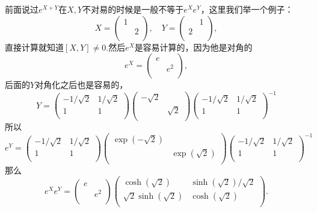 \documentclass[8pt]{book}
\theoremstyle{plain}
\begin{document}
前面说过$e^{X+Y}$在$X,Y$不对易的时候是一般不等于$e^Xe^Y$，这里我们举一个例子：
\[
X=\begin{pmatrix}
1&\\
&2\\
\end{pmatrix},
\quad
Y=\begin{pmatrix}
&1\\
2&\\
\end{pmatrix},
\]
直接计算就知道$[X,Y]\neq 0$.然后$e^X$是容易计算的，因为他是对角的
\[
e^X=\begin{pmatrix}
e&\\
&e^2\\
\end{pmatrix},
\]
后面的$Y$对角化之后也是容易的，
\[
Y=
\begin{pmatrix}
 -1/\sqrt{2} & 1/\sqrt{2} \\
 1 & 1 \\
\end{pmatrix}
\begin{pmatrix}
 -\sqrt{2} &  \\
  & \sqrt{2} \\
\end{pmatrix}
\begin{pmatrix}
 -1/\sqrt{2} & 1/\sqrt{2} \\
 1 & 1 \\
\end{pmatrix}^{-1}
\]
所以
\[
e^Y=
\begin{pmatrix}
 -1/\sqrt{2} & 1/\sqrt{2} \\
 1 & 1 \\
\end{pmatrix}
\begin{pmatrix}
 \exp(-\sqrt{2}) &  \\
  & \exp(\sqrt{2}) \\
\end{pmatrix}
\begin{pmatrix}
 -1/\sqrt{2} & 1/\sqrt{2} \\
 1 & 1 \\
\end{pmatrix}^{-1}
\]
那么
\[
e^Xe^Y=
\begin{pmatrix}
e&\\
&e^2\\
\end{pmatrix}
\begin{pmatrix}
\cosh \left(\sqrt{2}\right)&\sinh \left(\sqrt{2}\right)/\sqrt{2}\\
\sqrt{2} \sinh \left(\sqrt{2}\right)&\cosh \left(\sqrt{2}\right)\\
\end{pmatrix}.
\]
\end{document}
